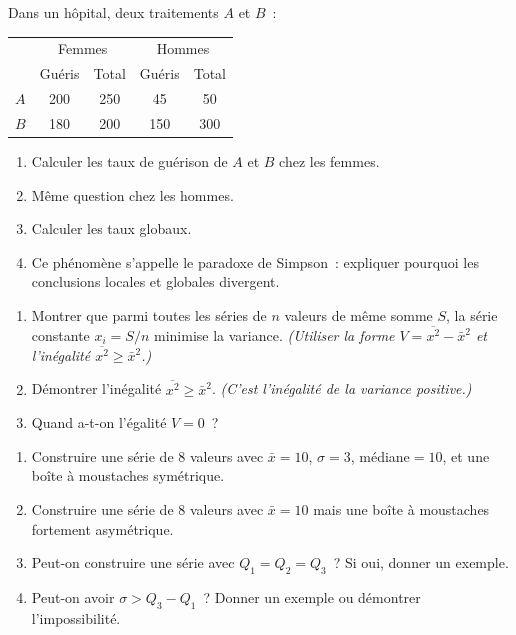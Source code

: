 \begin{challenge}
Dans un h\^opital, deux traitements $A$ et $B$~:
\begin{center}
\begin{tabular}{|l|cc|cc|}
\hline
\rowcolor{BN!10} & \multicolumn{2}{c|}{Femmes} & \multicolumn{2}{c|}{Hommes} \\
\rowcolor{BN!10} & Gu\'eris & Total & Gu\'eris & Total \\
\hline
$A$ & 200 & 250 & 45 & 50 \\
$B$ & 180 & 200 & 150 & 300 \\
\hline
\end{tabular}
\end{center}
\begin{enumerate}
  \item Calculer les taux de gu\'erison de $A$ et $B$ chez les femmes.
  \item M\^eme question chez les hommes.
  \item Calculer les taux globaux.
  \item Ce ph\'enom\`ene s'appelle le paradoxe de Simpson~:
        expliquer pourquoi les conclusions locales et globales divergent.
\end{enumerate}
\end{challenge}

\begin{challenge}
\begin{enumerate}
  \item Montrer que parmi toutes les s\'eries de $n$ valeurs de m\^eme
        somme $S$, la s\'erie constante $x_i=S/n$ minimise la variance.
        \emph{(Utiliser la forme $V=\overline{x^2}-\bar{x}^2$ et
        l'in\'egalit\'e $\overline{x^2}\geq\bar{x}^2$.)}
  \item D\'emontrer l'in\'egalit\'e $\overline{x^2}\geq\bar{x}^2$.
        \emph{(C'est l'in\'egalit\'e de la variance positive.)}
  \item Quand a-t-on l'\'egalit\'e $V=0$~?
\end{enumerate}
\end{challenge}

\begin{challenge}
\begin{enumerate}
  \item Construire une s\'erie de $8$ valeurs avec $\bar{x}=10$,
        $\sigma=3$, m\'ediane$=10$, et une bo\^ite \`a moustaches sym\'etrique.
  \item Construire une s\'erie de $8$ valeurs avec $\bar{x}=10$
        mais une bo\^ite \`a moustaches fortement asym\'etrique.
  \item Peut-on construire une s\'erie avec $Q_1=Q_2=Q_3$~? Si oui, donner un exemple.
  \item Peut-on avoir $\sigma > Q_3-Q_1$~? Donner un exemple ou d\'emontrer l'impossibilit\'e.
\end{enumerate}
\end{challenge}


